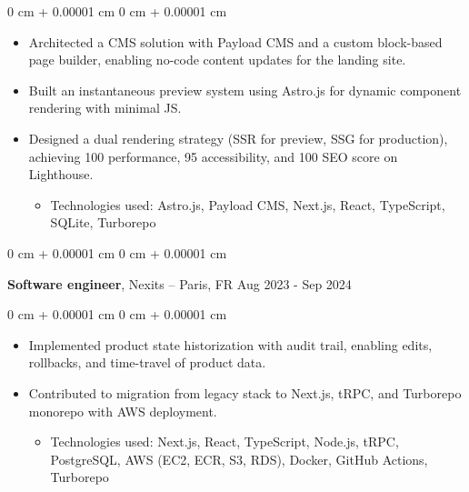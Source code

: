 \documentclass[10pt, letterpaper]{article}
\newenvironment{highlights}{
  \begin{itemize}[
    topsep=0.10 cm,
    parsep=0.10 cm,
    partopsep=0pt,
    itemsep=0pt,
    leftmargin=0 cm + 10pt
    ]
  }{
\end{itemize}
}
\newenvironment{highlightsforbulletentries}{
  \begin{itemize}[
    topsep=0 cm,
    parsep=0.10 cm,
    partopsep=0pt,
    itemsep=0pt,
    leftmargin=10pt
    ]
  }{
\end{itemize}
} %
\newenvironment{onecolentry}{
  \begin{adjustwidth}{
      0 cm + 0.00001 cm
    }{
      0 cm + 0.00001 cm
    }
  }{
  \end{adjustwidth}
} %
\newenvironment{twocolentry}[2][]{
  \onecolentry
  \def\secondColumn{#2}
  \setcolumnwidth{\fill, 4.5 cm}
  \begin{paracol}{2}
  }{
    \switchcolumn \raggedleft \secondColumn
  \end{paracol}
  \end{onecolentry}
} %
\begin{document}
  \vspace{0.10 cm}
  \begin{onecolentry}
    \begin{highlights}
  \item Architected a CMS solution with Payload CMS and a custom block-based page builder, enabling no-code content updates for the landing site.
  \item Built an instantaneous preview system using Astro.js for dynamic component rendering with minimal JS.
  \item Designed a dual rendering strategy (SSR for preview, SSG for production), achieving 100 performance, 95 accessibility, and 100 SEO score on Lighthouse.

          \begin{highlightsforbulletentries}
    \item Technologies used: Astro.js, Payload CMS, Next.js, React, TypeScript, SQLite, Turborepo
    \end{highlightsforbulletentries}

    \end{highlights}

  \end{onecolentry}




  \begin{twocolentry}{
      Aug 2023 - Sep 2024
    }
  \textbf{Software engineer}, Nexits  -- Paris, FR\end{twocolentry}

  \vspace{0.10 cm}
  \begin{onecolentry}
    \begin{highlights}

  \item Implemented product state historization with audit trail, enabling edits, rollbacks, and time-travel of product data.
  \item Contributed to migration from legacy stack to Next.js, tRPC, and Turborepo monorepo with AWS deployment.

                \begin{highlightsforbulletentries}
    \item Technologies used: Next.js, React, TypeScript, Node.js, tRPC, PostgreSQL, AWS (EC2, ECR, S3, RDS), Docker, GitHub Actions, Turborepo
    \end{highlightsforbulletentries}


    \end{highlights}

  \end{onecolentry}
\end{document}
